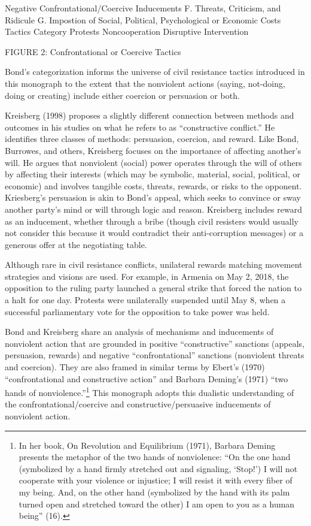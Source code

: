 \documentclass[twoside,a4paper,12pt,fleqn,openany]{extbook}
\begin{document}
Negative
Confrontational/Coercive
Inducements
F. Threats, Criticism, and Ridicule
G. Impostion of Social, Political, Psychological or Economic Costs
Tactics Category
Protests
Noncooperation
Disruptive Intervention

FIGURE 2: Confrontational or Coercive Tactics

Bond’s categorization informs the universe of civil resistance tactics introduced in this monograph to the extent that the nonviolent actions (saying, not-doing, doing or creating) include either coercion or persuasion or both.

Kreisberg (1998) proposes a slightly different connection between methods and outcomes in his studies on what he refers to as “constructive conflict.” He identifies three classes of methods: persuasion, coercion, and reward. Like Bond, Burrowes, and others, Kreisberg focuses on the importance of affecting another’s will. He argues that nonviolent (social) power operates through the will of others by affecting their interests (which may be symbolic, material, social, political, or economic) and involves tangible costs, threats, rewards, or risks to the opponent. Kriesberg’s persuasion is akin to Bond’s appeal, which seeks to convince or sway another party’s mind or will through logic and reason. Kreisberg includes reward as an inducement, whether through a bribe (though civil resisters would usually not consider this because it would contradict their anti-corruption messages) or a generous offer at the negotiating table.

Although rare in civil resistance conflicts, unilateral rewards matching movement strategies and visions are used. For example, in Armenia on May 2, 2018, the opposition to the ruling party launched a general strike that forced the nation to a halt for one day. Protests were unilaterally suspended until May 8, when a successful parliamentary vote for the opposition to take power was held.

Bond and Kreisberg share an analysis of mechanisms and inducements of nonviolent action that are grounded in positive “constructive” sanctions (appeals, persuasion, rewards) and negative “confrontational” sanctions (nonviolent threats and coercion). They are also framed in similar terms by Ebert’s (1970) “confrontational and constructive action” and Barbara Deming’s (1971) “two hands of nonviolence.”\footnote{In her book, On Revolution and Equilibrium (1971), Barbara Deming presents the metaphor of the two hands of nonviolence: “On the one hand (symbolized by a hand firmly stretched out and signaling, ‘Stop!’) I will not cooperate with your violence or injustice; I will resist it with every fiber of my being. And, on the other hand (symbolized by the hand with its palm turned open and stretched toward the other) I am open to you as a human being” (16).} This monograph adopts this dualistic understanding of the confrontational/coercive and constructive/persuasive inducements of nonviolent action.
\end{document}
